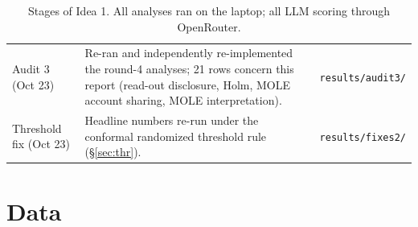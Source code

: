 \documentclass[11pt]{article}
\begin{document}
\begin{table}[!htbp]
\begin{tabularx}{\linewidth}{@{}>{\raggedright\arraybackslash}p{2.3cm}>{\raggedright\arraybackslash}X>{\raggedright\arraybackslash}p{2.6cm}@{}}
Audit 3 (Oct 23) & Re-ran and independently re-implemented the round-4 analyses; 21 rows concern this report (read-out disclosure, Holm, MOLE account sharing, MOLE interpretation). & \nolinkurl{results/audit3/}\\
Threshold fix (Oct 23) & Headline numbers re-run under the conformal randomized threshold rule (\S\ref{sec:thr}). & \nolinkurl{results/fixes2/}\\
\bottomrule
\end{tabularx}
\caption{Stages of Idea 1. All analyses ran on the laptop; all LLM scoring through OpenRouter.}
\end{table}

\section{Data}
\end{document}
